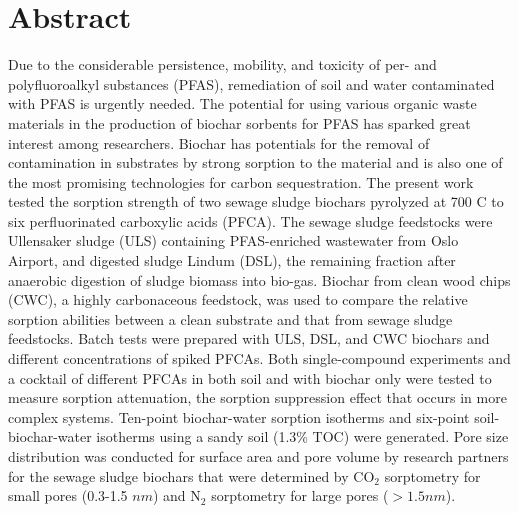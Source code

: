 \newpage
{}
\section*{Abstract}
Due to the considerable persistence, mobility, and toxicity of per- and polyfluoroalkyl substances (PFAS), remediation of soil and water contaminated with PFAS is urgently needed. The potential for using various organic waste materials in the production of biochar sorbents for PFAS has sparked great interest among researchers. Biochar has potentials for the removal of contamination in substrates by strong sorption to the material and is also one of the most promising technologies for carbon sequestration. The present work tested the sorption strength of two sewage sludge biochars pyrolyzed at 700 \textdegree C to six perfluorinated carboxylic acids (PFCA). The sewage sludge feedstocks were Ullensaker sludge (ULS) containing PFAS-enriched wastewater from Oslo Airport, and digested sludge Lindum (DSL), the remaining fraction after anaerobic digestion of sludge biomass into bio-gas. Biochar from clean wood chips (CWC), a highly carbonaceous feedstock, was used to compare the relative sorption abilities between a clean substrate and that from sewage sludge feedstocks. Batch tests were prepared with ULS, DSL, and CWC biochars and different concentrations of spiked PFCAs. Both single-compound experiments and a cocktail of different PFCAs in both soil and with biochar only were tested to measure sorption attenuation, the sorption suppression effect that occurs in more complex systems. Ten-point biochar-water sorption isotherms and six-point soil-biochar-water isotherms using a sandy soil (1.3\% TOC) were generated. Pore size distribution was conducted for surface area and pore volume by research partners for the sewage sludge biochars that were determined by $\mathrm{CO_2}$ sorptometry for small pores (0.3-1.5 $nm$) and $\mathrm{N_2}$ sorptometry for large pores ($>1.5 nm$). 

